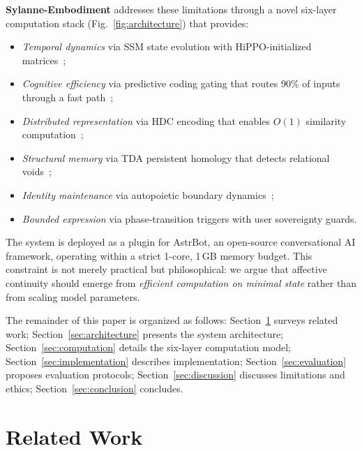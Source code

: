 \documentclass[10pt,twocolumn]{article}
\begin{document}
\textbf{Sylanne-Embodiment} addresses these limitations through a novel six-layer computation stack (Fig.~\ref{fig:architecture}) that provides:

\begin{itemize}[nosep,leftmargin=*]
\item \emph{Temporal dynamics} via SSM state evolution with HiPPO-initialized matrices~\cite{hippo2020,gu2022s4};
\item \emph{Cognitive efficiency} via predictive coding gating that routes 90\% of inputs through a fast path~\cite{rao1999predictive,clark2013whatever};
\item \emph{Distributed representation} via HDC encoding that enables $O(1)$ similarity computation~\cite{kanerva2009hdc};
\item \emph{Structural memory} via TDA persistent homology that detects relational voids~\cite{edelsbrunner2010tda,ghrist2008barcodes};
\item \emph{Identity maintenance} via autopoietic boundary dynamics~\cite{maturana1980autopoiesis,varela1991embodied};
\item \emph{Bounded expression} via phase-transition triggers with user sovereignty guards.
\end{itemize}

The system is deployed as a plugin for AstrBot, an open-source conversational AI framework, operating within a strict 1-core, 1\,GB memory budget. This constraint is not merely practical but philosophical: we argue that affective continuity should emerge from \emph{efficient computation on minimal state} rather than from scaling model parameters.

The remainder of this paper is organized as follows: Section~\ref{sec:related} surveys related work; Section~\ref{sec:architecture} presents the system architecture; Section~\ref{sec:computation} details the six-layer computation model; Section~\ref{sec:implementation} describes implementation; Section~\ref{sec:evaluation} proposes evaluation protocols; Section~\ref{sec:discussion} discusses limitations and ethics; Section~\ref{sec:conclusion} concludes.

\section{Related Work}
\label{sec:related}
\end{document}
